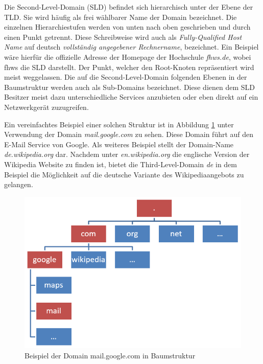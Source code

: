 Die Second-Level-Domain (SLD) befindet sich hierarchisch unter der Ebene der TLD. Sie wird häufig als frei wählbarer Name der Domain bezeichnet. Die einzelnen Hierarchiestufen werden von unten nach oben geschrieben und durch einen Punkt getrennt. Diese Schreibweise wird auch als \textit{Fully-Qualified Host Name} auf deutsch \textit{vollständig angegebener Rechnername}, bezeichnet. Ein Beispiel wäre hierfür die offizielle Adresse der Homepage der Hochschule \textit{fhws.de}, wobei fhws die SLD darstellt. Der Punkt, welcher den Root-Knoten repräsentiert wird meist weggelassen. Die auf die Second-Level-Domain folgenden Ebenen in der Baumstruktur werden auch als Sub-Domains bezeichnet. Diese dienen dem SLD Besitzer meist dazu unterschiedliche Services anzubieten oder eben direkt auf ein Netzwerkgerät zuzugreifen. \cite{Schreiner.2016} \cite{1und1.2018} 

Ein vereinfachtes Beispiel einer solchen Struktur ist in Abbildung \ref{fig:DNSTree} unter Verwendung der Domain \textit{mail.google.com} zu sehen. Diese Domain führt auf den E-Mail Service von Google. Als weiteres Beispiel stellt der Domain-Name \textit{de.wikipedia.org} dar. Nachdem unter \textit{en.wikipedia.org} die englische Version der Wikipedia Website zu finden ist, bietet die Third-Level-Domain \textit{de} in dem Beispiel die Möglichkeit auf die deutsche Variante des Wikipediaangebots zu gelangen.

\begin{figure}[ht]
\includegraphics[width=\columnwidth]{images/dnsTree.png}
\caption{Beispiel der Domain mail.google.com in Baumstruktur}
\label{fig:DNSTree}
\end{figure}

